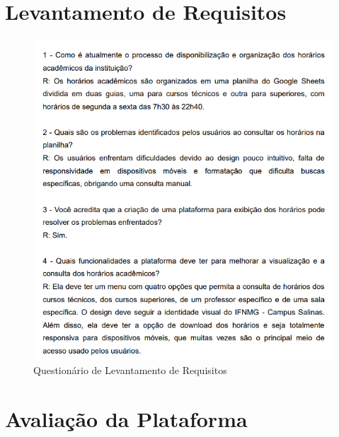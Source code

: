 \begin{apendicesenv}
\label{apendice}

\chapter{Levantamento de Requisitos} \label{apendiceA}

\begin{figure}[htb] 
    \centering
    \includegraphics[width=1\textwidth]{Figuras/QLevantamento.png}
    \caption{Questionário de Levantamento de Requisitos}
    \label{fig_qlevantamento}
\end{figure}

\chapter{Avaliação da Plataforma} \label{apendiceB}


\end{apendicesenv}
